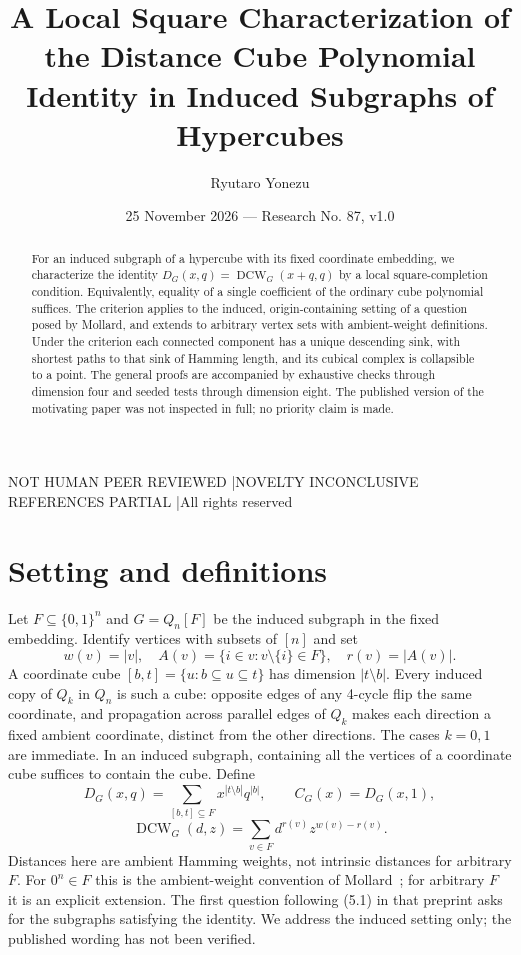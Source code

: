 \documentclass[11pt,a4paper]{article}
\title{A Local Square Characterization of the Distance Cube Polynomial Identity in Induced Subgraphs of Hypercubes}
\author{Ryutaro Yonezu}
\date{25 November 2026 --- Research No. 87, v1.0}
\newcommand{\DCW}{\operatorname{DCW}}
\begin{document}
\maketitle
\begin{center}\small NOT HUMAN PEER REVIEWED \enspace|\enspace NOVELTY INCONCLUSIVE\\ REFERENCES PARTIAL \enspace|\enspace All rights reserved\end{center}
\begin{abstract}
For an induced subgraph of a hypercube with its fixed coordinate embedding, we characterize the identity $D_G(x,q)=\DCW_G(x+q,q)$ by a local square-completion condition. Equivalently, equality of a single coefficient of the ordinary cube polynomial suffices. The criterion applies to the induced, origin-containing setting of a question posed by Mollard, and extends to arbitrary vertex sets with ambient-weight definitions. Under the criterion each connected component has a unique descending sink, with shortest paths to that sink of Hamming length, and its cubical complex is collapsible to a point. The general proofs are accompanied by exhaustive checks through dimension four and seeded tests through dimension eight. The published version of the motivating paper was not inspected in full; no priority claim is made.
\end{abstract}
\section{Setting and definitions}
Let $F\subseteq\{0,1\}^n$ and $G=Q_n[F]$ be the induced subgraph in the fixed embedding. Identify vertices with subsets of $[n]$ and set
\[
 w(v)=|v|,\quad A(v)=\{i\in v:v\setminus\{i\}\in F\},\quad r(v)=|A(v)|.
\]
A coordinate cube $[b,t]=\{u:b\subseteq u\subseteq t\}$ has dimension $|t\setminus b|$. Every induced copy of $Q_k$ in $Q_n$ is such a cube: opposite edges of any 4-cycle flip the same coordinate, and propagation across parallel edges of $Q_k$ makes each direction a fixed ambient coordinate, distinct from the other directions. The cases $k=0,1$ are immediate. In an induced subgraph, containing all the vertices of a coordinate cube suffices to contain the cube.
Define
\[
 D_G(x,q)=\sum_{[b,t]\subseteq F}x^{|t\setminus b|}q^{|b|},\qquad C_G(x)=D_G(x,1),
\]
\[
 \DCW_G(d,z)=\sum_{v\in F}d^{r(v)}z^{w(v)-r(v)}.
\]
Distances here are ambient Hamming weights, not intrinsic distances for arbitrary $F$. For $0^n\in F$ this is the ambient-weight convention of Mollard~\cite{mollard}; for arbitrary $F$ it is an explicit extension. The first question following (5.1) in that preprint asks for the subgraphs satisfying the identity. We address the induced setting only; the published wording has not been verified.
\end{document}
